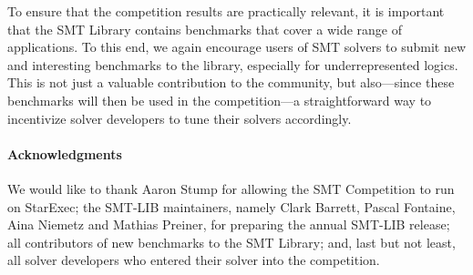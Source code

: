 \documentclass[dvipsnames,table,twoside,11pt]{article}
\begin{document}
To ensure that the competition results are practically relevant, it is
important that the SMT Library contains benchmarks that cover a wide
range of applications.  To this end, we again encourage users of SMT
solvers to submit new and interesting benchmarks to the library,
especially for underrepresented logics.  This is not just a valuable
contribution to the community, but also---since these benchmarks will
then be used in the competition---a straightforward way to incentivize
solver developers to tune their solvers accordingly.

\paragraph{Acknowledgments}

We would like to thank Aaron Stump for allowing the SMT Competition to
run on StarExec; the SMT-LIB maintainers, namely Clark Barrett, Pascal
Fontaine, Aina Niemetz and Mathias Preiner, for preparing the annual
SMT-LIB release; all contributors of new benchmarks to the SMT
Library; and, last but not least, all solver developers who entered
their solver into the competition.




\end{document}
